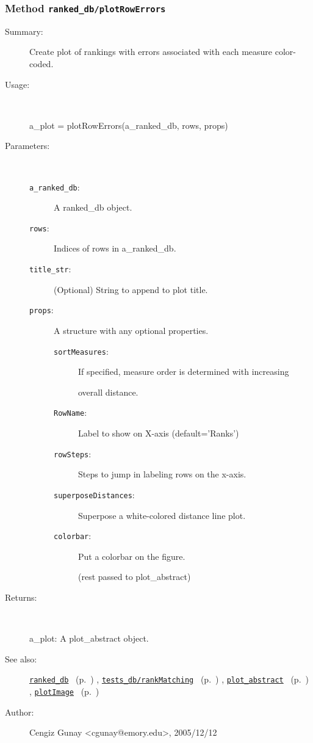 \subsubsection[Method \texttt{plotRowErrors}]{Method \texttt{ranked\_db/plotRowErrors}}%
%
\label{ref_ranked_db__plotRowErrors}%
\hypertarget{ref_ranked_db__plotRowErrors}{}%
\begin{description}
\item[Summary:]Create plot of rankings with errors associated with each measure color-coded.
%
\item[Usage:]~%
\begin{lyxcode}%
a\_plot = plotRowErrors(a\_ranked\_db, rows, props)
%
\end{lyxcode}%
%
%
\item[Parameters:]~
\begin{description}%
\item[\texttt{a\_ranked\_db}:]
 A ranked\_db object.
\item[\texttt{rows}:]
 Indices of rows in a\_ranked\_db.
\item[\texttt{title\_str}:]
 (Optional) String to append to plot title.
\item[\texttt{props}:]
 A structure with any optional properties.
\begin{description}%
\item[\texttt{sortMeasures}:]
 If specified, measure order is determined with increasing 

overall distance.
\item[\texttt{RowName}:]
 Label to show on X-axis (default='Ranks')
\item[\texttt{rowSteps}:]
 Steps to jump in labeling rows on the x-axis.
\item[\texttt{superposeDistances}:]
 Superpose a white-colored distance line plot.
\item[\texttt{colorbar}:]
 Put a colorbar on the figure.

(rest passed to plot\_abstract)
\end{description}%
\end{description}%
%
\item[Returns:
]~

	a\_plot: A plot\_abstract object.
%
%
\item[See also:]%
\hyperlink{ref_ranked_db}{\texttt{ranked\_db}}%
\ (p.~\pageref{ref_ranked_db})%
%
, \hyperlink{ref_tests_db__rankMatching}{\texttt{tests\_db/rankMatching}}%
\ (p.~\pageref{ref_tests_db__rankMatching})%
%
, \hyperlink{ref_plot_abstract}{\texttt{plot\_abstract}}%
\ (p.~\pageref{ref_plot_abstract})%
%
, \hyperlink{ref_plotImage}{\texttt{plotImage}}%
\ (p.~\pageref{ref_plotImage})%
%
%
\item[Author:]%
Cengiz Gunay <cgunay@emory.edu>, 2005/12/12
%
\end{description}
\methodline%
